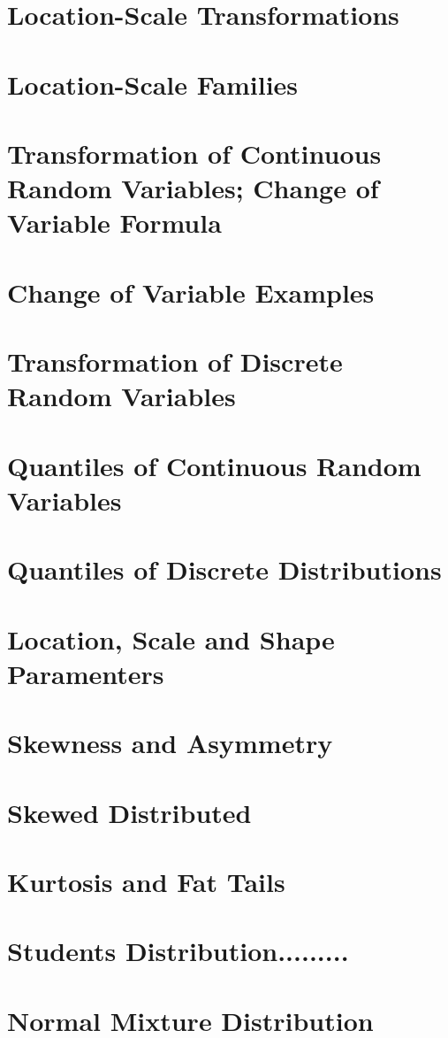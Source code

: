 \documentclass[11pt]{article}
\begin{document}
    \section{Location-Scale Transformations}
    \section{Location-Scale Families}
    \section{Transformation of Continuous Random Variables; Change of Variable Formula}
    \section{Change of Variable Examples}
    \section{Transformation of Discrete Random Variables}
    \section{Quantiles of Continuous Random Variables}
    \section{Quantiles of Discrete Distributions}
    \section{Location, Scale and Shape Paramenters}
    \section{Skewness and Asymmetry}
    \section{Skewed Distributed}
    \section{Kurtosis and Fat Tails}
    \section{Students Distribution.........}
    \section{Normal Mixture Distribution}
\end{document}
